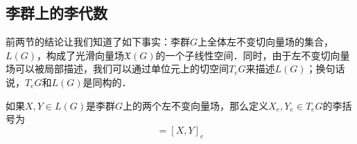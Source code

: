 \subsection{李群上的李代数}

前两节的结论让我们知道了如下事实：李群$G$上全体左不变切向量场的集合，$L(G)$，构成了光滑向量场$\mathfrak{X}(G)$的一个子线性空间．同时，由于左不变切向量场可以被局部描述，我们可以通过单位元上的切空间$T_eG$来描述$L(G)$；换句话说，$T_eG$和$L(G)$是同构的．

\begin{definition}{}
如果$X, Y\in L(G)$是李群$G$上的两个左不变向量场，那么定义$X_e, Y_e\in T_eG$的李括号为
\begin{equation}
[X_e, Y_e]=[X, Y]_e
\end{equation}
\end{definition}














